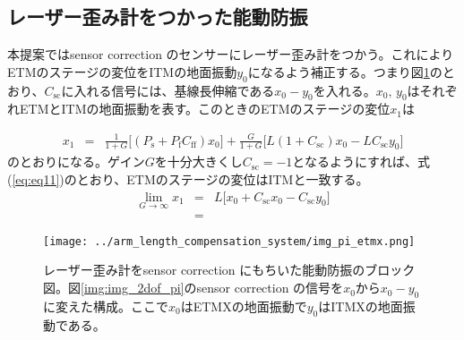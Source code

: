 \documentclass[a4paper,12pt]{jsarticle}
\begin{document}
\subsection{レーザー歪み計をつかった能動防振}

本提案ではsensor correction のセンサーにレーザー歪み計をつかう。これによりETMのステージの変位をITMの地面振動$y_0$になるよう補正する。つまり図\ref{img:img_pi_etmx}のとおり、$C_{\mathrm{sc}}$に入れる信号には、基線長伸縮である$x_0-y_0$を入れる。$x_0,\, y_0$はそれぞれETMとITMの地面振動を表す。このときのETMのステージの変位$x_1$は

\begin{eqnarray}
  x_1 &=& \frac{1}{1+G}\Biggl[(P_{\mathrm{s}}+P_{\mathrm{f}}C_{\mathrm{ff}})x_0\Biggl]
  + \frac{G}{1+G}\Biggl[L(1+C_{\mathrm{sc}})x_0 - LC_{\mathrm{sc}}y_0\Biggl]
\end{eqnarray}
のとおりになる。ゲイン$G$を十分大きくし$C_{\mathrm{sc}}=-1$となるようにすれば、式(\ref{eq:eq11})のとおり、ETMのステージの変位はITMと一致する。
\begin{eqnarray}\label{eq:eq10}
  \lim_{G \to \infty} x_{1} &=& L\Biggl[x_0+C_{\mathrm{sc}}x_0-C_{\mathrm{sc}}y_0\Biggl] \\
  &=&  
\end{eqnarray}


\begin{figure}[H]
  \begin{center}
    \texttt{[image: ../arm\_length\_compensation\_system/img\_pi\_etmx.png]}
  \end{center}
  \caption{レーザー歪み計をsensor correction にもちいた能動防振のブロック図。図\ref{img:img_2dof_pi}のsensor correction の信号を$x_0$から$x_0-y_0$に変えた構成。ここで$x_0$はETMXの地面振動で$y_0$はITMXの地面振動である。}\label{img:img_pi_etmx}
\end{figure}


\end{document}
